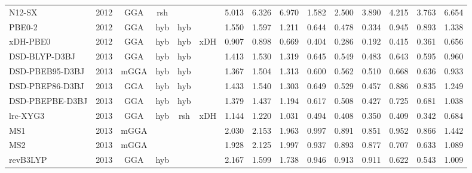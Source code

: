 \begin{landscape}
\begin{longtable}{lcccccrrrrrrrrr}
    N12-SX           & 2012 & GGA  & rsh      &             &           & 5.013             & 6.326             & 6.970  & 1.582              & 2.500             & 3.890  & 4.215   & 3.763 & 6.654 \\
    PBE0-2           & 2012 & GGA  & hyb      & hyb         &           & 1.550             & 1.597             & 1.211  & 0.644              & 0.478             & 0.334  & 0.945   & 0.893 & 1.338 \\
    xDH-PBE0         & 2012 & GGA  & hyb      & hyb         & xDH       & 0.907             & 0.898             & 0.669  & 0.404              & 0.286             & 0.192  & 0.415   & 0.361 & 0.656 \\
    DSD-BLYP-D3BJ    & 2013 & GGA  & hyb      & hyb         &           & 1.413             & 1.530             & 1.319  & 0.645              & 0.549             & 0.483  & 0.643   & 0.595 & 0.960 \\
    DSD-PBEB95-D3BJ  & 2013 & mGGA & hyb      & hyb         &           & 1.367             & 1.504             & 1.313  & 0.600              & 0.562             & 0.510  & 0.668   & 0.636 & 0.933 \\
    DSD-PBEP86-D3BJ  & 2013 & GGA  & hyb      & hyb         &           & 1.433             & 1.540             & 1.303  & 0.649              & 0.529             & 0.457  & 0.886   & 0.835 & 1.249 \\
    DSD-PBEPBE-D3BJ  & 2013 & GGA  & hyb      & hyb         &           & 1.379             & 1.437             & 1.194  & 0.617              & 0.508             & 0.427  & 0.725   & 0.681 & 1.038 \\
    lrc-XYG3         & 2013 & GGA  & hyb      & rsh         & xDH       & 1.144             & 1.220             & 1.031  & 0.494              & 0.408             & 0.350  & 0.409   & 0.342 & 0.684 \\
    MS1              & 2013 & mGGA &          &             &           & 2.030             & 2.153             & 1.963  & 0.997              & 0.891             & 0.851  & 0.952   & 0.866 & 1.442 \\
    MS2              & 2013 & mGGA &          &             &           & 1.928             & 2.125             & 1.997  & 0.937              & 0.893             & 0.877  & 0.707   & 0.633 & 1.089 \\
    revB3LYP         & 2013 & GGA  & hyb      &             &           & 2.167             & 1.599             & 1.738  & 0.946              & 0.913             & 0.911  & 0.622   & 0.543 & 1.009 \\

\end{longtable}
\end{landscape}
